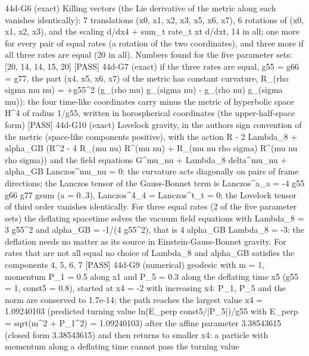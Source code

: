 \documentclass[
  10pt,
]{article}
\newenvironment{Shaded}{}{}
\newcommand{\NormalTok}[1]{#1}
\begin{document}
\begin{Shaded}
\begin{Highlighting}[]
\NormalTok{[PASS] 44d{-}G6  (exact) Killing vectors (the Lie derivative of the metric along each vanishes identically): 7 translations (x0, x1, x2, x3, x5, x6, x7), 6 rotations of (x0, x1, x2, x3), and the scaling d/dx4 + sum\_t rate\_t xt d/dxt, 14 in all; one more for every pair of equal rates (a rotation of the two coordinates), and three more if all three rates are equal (20 in all). Numbers found for the five parameter sets: [20, 14, 14, 15, 20]}
\NormalTok{[PASS] 44d{-}G7  (exact) if the three rates are equal, g55 = g66 = g77, the part (x4, x5, x6, x7) of the metric has constant curvature, R\_(rho sigma mu nu) = +g55\^{}2 (g\_(rho mu) g\_(sigma nu) {-} g\_(rho nu) g\_(sigma mu)): the four time{-}like coordinates carry minus the metric of hyperbolic space H\^{}4 of radius 1/g55, written in horospherical coordinates (the upper{-}half{-}space form)}
\NormalTok{[PASS] 44d{-}G10  (exact) Lovelock gravity, in the author\textquotesingle{}s sign convention of the metric (space{-}like components positive), with the action R {-} 2 Lambda\_8 + alpha\_GB (R\^{}2 {-} 4 R\_(mu nu) R\^{}(mu nu) + R\_(mu nu rho sigma) R\^{}(mu nu rho sigma)) and the field equations G\^{}mu\_nu + Lambda\_8 delta\^{}mu\_nu + alpha\_GB Lanczos\^{}mu\_nu = 0: the curvature acts diagonally on pairs of frame directions; the Lanczos tensor of the Gauss{-}Bonnet term is Lanczos\^{}a\_a = {-}4 g55 g66 g77 gsum (a = 0..3), Lanczos\^{}4\_4 = Lanczos\^{}t\_t = 0; the Lovelock tensor of third order vanishes identically. For three equal rates (2 of the five parameter sets) the deflating spacetime solves the vacuum field equations with Lambda\_8 = 3 g55\^{}2 and alpha\_GB = {-}1/(4 g55\^{}2), that is 4 alpha\_GB Lambda\_8 = {-}3: the deflation needs no matter as its source in Einstein{-}Gauss{-}Bonnet gravity. For rates that are not all equal no choice of Lambda\_8 and alpha\_GB satisfies the components 4, 5, 6, 7}
\NormalTok{[PASS] 44d{-}G9  (numerical) geodesic with m = 1, momentum P\_1 = 0.5 along x1 and P\_5 = 0.3 along the deflating time x5 (g55 = 1, const5 = 0.8), started at x4 = {-}2 with increasing x4: P\_1, P\_5 and the norm are conserved to 1.7e{-}14; the path reaches the largest value x4 = 1.09240103 (predicted turning value ln(E\_perp const5/|P\_5|)/g55 with E\_perp = sqrt(m\^{}2 + P\_1\^{}2) = 1.09240103) after the affine parameter 3.38543615 (closed form 3.38543615) and then returns to smaller x4: a particle with momentum along a deflating time cannot pass the turning value}

\end{Highlighting}
\end{Shaded}
\end{document}
